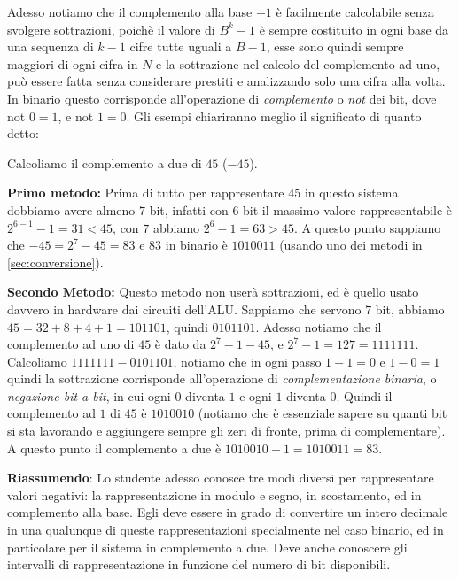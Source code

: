 Adesso notiamo che il complemento alla base $-1$ è facilmente calcolabile
senza svolgere sottrazioni, poichè il valore di $B^k-1$ è sempre costituito in ogni base da una sequenza di $k-1$ cifre tutte uguali a $B-1$, esse sono quindi sempre maggiori di ogni cifra in $N$ e la sottrazione nel calcolo del complemento ad uno, può essere fatta senza considerare prestiti e analizzando solo una cifra alla volta. In binario questo corrisponde all'operazione di \emph{complemento} o \emph{not} dei bit, dove \textsf{not} $0 = 1$, e \textsf{not} $1 = 0$. Gli
esempi chiariranno meglio il significato di quanto detto:

\begin{ex} Calcoliamo il complemento a due di $45$ ($-45$).

\noindent \textbf{Primo metodo:} Prima di tutto per rappresentare $45$ in
questo sistema dobbiamo avere almeno $7$ bit, infatti con $6$ bit il massimo
valore rappresentabile è $2^{6-1}-1 = 31 < 45$, con $7$ abbiamo $2^6-1 =
63>45$. A questo punto sappiamo che $-45 = 2^7-45 = 83$ e $83$ in binario è
$1010011$ (usando uno dei metodi in \ref{sec:conversione}).\medskip

\noindent \textbf{Secondo Metodo:} Questo metodo non userà sottrazioni, ed è
quello usato davvero in hardware dai circuiti dell'ALU. Sappiamo che servono
$7$ bit, abbiamo $45 = 32+8+4+1 = 101101$, quindi $0101101$. Adesso notiamo che
il complemento ad uno di $45$ è dato da $2^7-1-45$, e $2^7-1 = 127 = 1111111$.
Calcoliamo $1111111-0101101$, notiamo che in ogni passo $1-1=0$ e $1-0=1$
quindi la sottrazione corrisponde all'operazione di \emph{complementazione
binaria}, o \emph{negazione bit-a-bit}, in cui ogni $0$ diventa $1$ e ogni $1$
diventa $0$. Quindi il complemento ad $1$ di $45$ è $1010010$ (notiamo che è
essenziale sapere su quanti bit si sta lavorando e aggiungere sempre gli zeri
di fronte, prima di complementare). A questo punto il complemento a due è
$1010010+1 = 1010011 = 83$. \end{ex}

\textbf{Riassumendo}: 
Lo studente adesso conosce tre modi diversi per rappresentare
valori negativi: la rappresentazione in modulo e segno, in scostamento, ed in
complemento alla base. Egli deve essere in grado di convertire un intero decimale in una qualunque di queste rappresentazioni specialmente nel caso
binario, ed in particolare per il sistema in complemento a due.
Deve anche conoscere gli intervalli di rappresentazione in funzione del numero di bit disponibili. 

